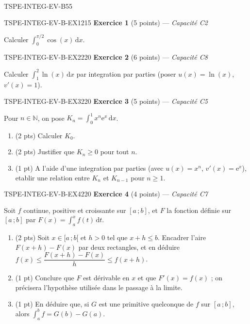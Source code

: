 \begin{evaluation}{TSPE-INTEG-EV-B}{55}

\begin{exercice}{TSPE-INTEG-EV-B-EX1}{2}{15}
\textbf{Exercice 1} (5 points) — \textit{Capacité C2}

\medskip

Calculer $\displaystyle\int_0^{\pi/2} \cos(x)\,\mathrm{d}x$.
\end{exercice}

\begin{exercice}{TSPE-INTEG-EV-B-EX2}{2}{20}
\textbf{Exercice 2} (6 points) — \textit{Capacité C8}

\medskip

Calculer $\displaystyle\int_1^2 \ln(x)\,\mathrm{d}x$ par integration par parties (poser $u(x)=\ln(x)$, $v'(x)=1$).
\end{exercice}

\begin{exercice}{TSPE-INTEG-EV-B-EX3}{2}{20}
\textbf{Exercice 3} (5 points) — \textit{Capacité C5}

\medskip

Pour $n \in \mathbb{N}$, on pose $K_n = \displaystyle\int_0^1 x^n \mathrm{e}^x\,\mathrm{d}x$.
\begin{enumerate}
  \item (2 pts) Calculer $K_0$.
  \item (2 pts) Justifier que $K_n \geq 0$ pour tout $n$.
  \item (1 pt) A l'aide d'une integration par parties (avec $u(x)=x^n$, $v'(x)=\mathrm{e}^x$), etablir une relation entre $K_n$ et $K_{n-1}$ pour $n\geq 1$.
\end{enumerate}
\end{exercice}

\begin{exercice}{TSPE-INTEG-EV-B-EX4}{2}{20}
\textbf{Exercice 4} (4 points) — \textit{Capacité C7}

\medskip

Soit $f$ continue, positive et croissante sur $[a\,;b]$, et $F$ la fonction définie sur $[a\,;b]$ par $F(x)=\displaystyle\int_a^x f(t)\,\mathrm{d}t$.
\begin{enumerate}
  \item (2 pts) Soit $x\in[a\,;b[$ et $h>0$ tel que $x+h\leq b$. Encadrer l'aire $F(x+h)-F(x)$ par deux rectangles, et en déduire
  $f(x)\leq\dfrac{F(x+h)-F(x)}{h}\leq f(x+h)$.
  \item (1 pt) Conclure que $F$ est dérivable en $x$ et que $F'(x)=f(x)$ ; on précisera l'hypothèse utilisée dans le passage à la limite.
  \item (1 pt) En déduire que, si $G$ est une primitive quelconque de $f$ sur $[a\,;b]$, alors $\displaystyle\int_a^b f = G(b)-G(a)$.
\end{enumerate}
\end{exercice}

\end{evaluation}
